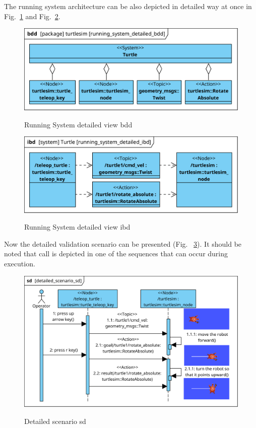 \documentclass[11pt,oneside,a4paper]{report}
\begin{document}
The running system architecture can be also depicted in detailed way at once in Fig.~\ref{fig:running_system_detailed_bdd} and Fig.~\ref{fig:running_system_detailed_ibd}.
			
\begin{figure}[H]
	\centering
	\begin{center}
		{\includegraphics[scale=.9]{diagrams/running_system_detailed_bdd.png}}
	\end{center}
	\caption{Running System detailed view bdd}
	\label{fig:running_system_detailed_bdd}
\end{figure}

\begin{figure}[H]
	\centering
	\begin{center}
		{\includegraphics[scale=.9]{diagrams/running_system_detailed_ibd.png}}
	\end{center}
	\caption{Running System detailed view ibd}
	\label{fig:running_system_detailed_ibd}
\end{figure}
			
Now the detailed validation scenario can be presented (Fig.~ \ref{fig:detailed_scenario_sd}). It should be noted that \stAction{} call is depicted in one of the sequences that can occur during \stSystem{} execution.
			
\begin{figure}[H]
	\centering
	\begin{center}
		{\includegraphics[scale=.9]{diagrams/detailed_scenario_sd.png}}
	\end{center}
	\caption{Detailed scenario sd}
	\label{fig:detailed_scenario_sd}
\end{figure}
			
\AtNextBibliography{\small}
\printbibliography
	
\end{document}
